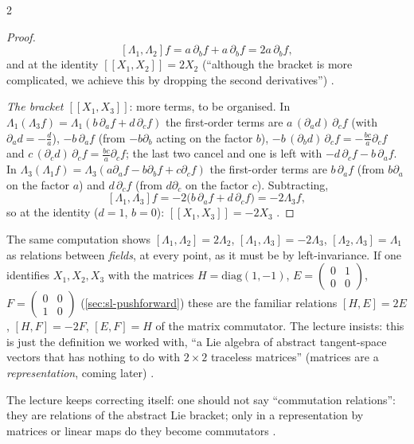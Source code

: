 \begin{paracol}{2}
\begin{proof}
\[
  [\Lambda_1,\Lambda_2]f=a\,\partial_bf+a\,\partial_bf=2a\,\partial_bf,
\]
and at the identity $[\![X_1,X_2]\!]=2X_2$ (``although the bracket is more complicated, we achieve this by dropping the second derivatives'')       .\par
\emph{The bracket $[\![X_1,X_3]\!]$}: more terms, to be organised. In $\Lambda_1(\Lambda_3f)=\Lambda_1(b\,\partial_af+d\,\partial_cf)$ the first-order terms are $a\,(\partial_ad)\,\partial_cf$ (with $\partial_ad=-\frac da$), $-b\,\partial_af$ (from $-b\partial_b$ acting on the factor $b$), $-b\,(\partial_bd)\,\partial_cf=-\frac{bc}a\partial_cf$ and $c\,(\partial_cd)\,\partial_cf=\frac{bc}{a}\partial_cf$; the last two cancel and one is left with $-d\,\partial_cf-b\,\partial_af$. In $\Lambda_3(\Lambda_1f)=\Lambda_3(a\partial_af-b\partial_bf+c\partial_cf)$ the first-order terms are $b\,\partial_af$ (from $b\partial_a$ on the factor $a$) and $d\,\partial_cf$ (from $d\partial_c$ on the factor $c$). Subtracting,
\[
  [\Lambda_1,\Lambda_3]f=-2\bigl(b\,\partial_af+d\,\partial_cf\bigr)=-2\Lambda_3f,
\]
so at the identity ($d=1$, $b=0$): $[\![X_1,X_3]\!]=-2X_3$             .
\end{proof}
\begin{coursenote}
The same computation shows $[\Lambda_1,\Lambda_2]=2\Lambda_2$, $[\Lambda_1,\Lambda_3]=-2\Lambda_3$, $[\Lambda_2,\Lambda_3]=\Lambda_1$ as relations between \emph{fields}, at every point, as it must be by left-invariance. If one identifies $X_1,X_2,X_3$ with the matrices $H=\mathrm{diag}(1,-1)$, $E=\begin{pmatrix}0&1\\0&0\end{pmatrix}$, $F=\begin{pmatrix}0&0\\1&0\end{pmatrix}$ (\cref{sec:sl-pushforward}) these are the familiar relations $[H,E]=2E$, $[H,F]=-2F$, $[E,F]=H$ of the matrix commutator. The lecture insists: this is just the definition we worked with, ``a Lie algebra of abstract tangent-space vectors that has nothing to do with $2\times2$ traceless matrices'' (matrices are a \emph{representation}, coming later) .
\end{coursenote}
\begin{aside}
The lecture keeps correcting itself: one should not say ``commutation relations'': they are relations of the abstract Lie bracket; only in a representation by matrices or linear maps do they become commutators  .
\end{aside}


\end{paracol}
